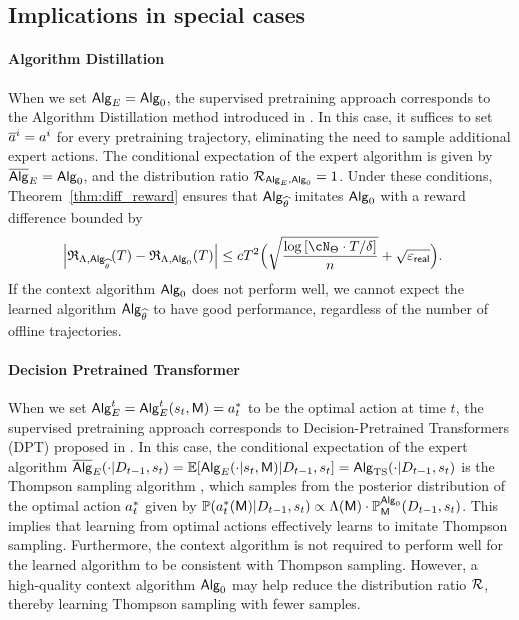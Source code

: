 \subsection{Implications in special cases}

\paragraph{Algorithm Distillation} When we set ${\mathsf{Alg}}_{E} = {\mathsf{Alg}}_0$, the supervised pretraining approach corresponds to the Algorithm Distillation method introduced in \cite{laskin2022context}. In this case, it suffices to set ${\overline{a}}^{i} = {a}^{i}$ for every pretraining trajectory, eliminating the need to sample additional expert actions. The conditional expectation of the expert algorithm is given by $\overline{\mathsf{Alg}}_{E} = {\mathsf{Alg}}_0$, and the distribution ratio ${\mathcal{R}}_{{\mathsf{Alg}}_{E},{\mathsf{Alg}}_0}=1$. Under these conditions, Theorem~\ref{thm:diff_reward} ensures that ${\mathsf{Alg}}_{\widehat{\theta}}$ imitates ${\mathsf{Alg}}_0$ with a reward difference bounded by
\begin{align*}
\Big|\totreward_{\prior,\sAlg_\EstPar}(\totlen)-\totreward_{\prior,\sAlg_0}(\totlen)\Big|
&\leq c \totlen^2 \Big( \sqrt{\frac{\log \brac{ \cN_{\Parspace} \cdot \totlen/\delta } }{n} } + \sqrt{\geneps} \Big).
\end{align*}
If the context algorithm ${\mathsf{Alg}}_0$ does not perform well, we cannot expect the learned algorithm ${\mathsf{Alg}}_{\widehat{\theta}}$ to have good performance, regardless of the number of offline trajectories.


\paragraph{Decision Pretrained Transformer} When we set ${\mathsf{Alg}}_{E}^t = {\mathsf{Alg}}_{E}^t({s}_t,{\mathsf{M}})={a}^*_t$ to be the optimal action at time $t$, the supervised pretraining approach corresponds to Decision-Pretrained Transformers (DPT) proposed in \cite{lee2023supervised}. In this case, the conditional expectation of the expert algorithm $\overline{\mathsf{Alg}}_{E}(\cdot|{D}_{t-1},{s}_t)=\mathbb{E}[{\mathsf{Alg}}_{{E}}(\cdot|{s}_t,{\mathsf{M}})|{D}_{t-1},{s}_t]={\mathsf{Alg}}_{{\mathrm{TS}}}(\cdot|{D}_{t-1},{s}_t)$ is the Thompson sampling algorithm \citep[Theorem 1]{lee2023supervised}, which samples from the posterior distribution of the optimal action ${a}^*_t$ given by $\mathbb{P}(a^*_t({\mathsf{M}}) |{D}_{t-1},{s}_t)\propto {\Lambda}({\mathsf{M}})\cdot\mathbb{P}_{\mathsf{M}}^{{\mathsf{Alg}}_0}({D}_{t-1},{s}_t)$. This implies that learning from optimal actions effectively learns to imitate Thompson sampling. Furthermore, the context algorithm is not required to perform well for the learned algorithm to be consistent with Thompson sampling. However, a high-quality context algorithm ${\mathsf{Alg}}_0$ may help reduce the distribution ratio ${\mathcal{R}}$, thereby learning Thompson sampling with fewer samples.





